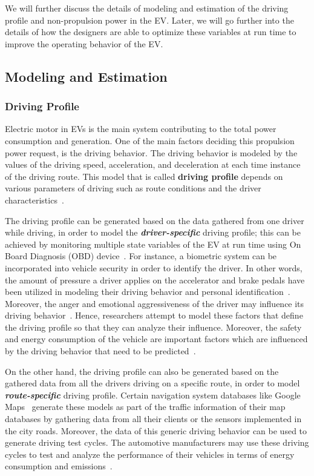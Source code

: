 We will further discuss the details of modeling and estimation of the driving profile and non-propulsion power in the EV. Later, we will go further into the details of how the designers are able to optimize these variables at run time to improve the operating behavior of the EV.

\subsection{Modeling and Estimation}

\subsubsection{Driving Profile}

Electric motor in EVs is the main system contributing to the total power consumption and generation. One of the main factors deciding this propulsion power request, is the driving behavior. The driving behavior is modeled by the values of the driving speed, acceleration, and deceleration at each time instance of the driving route. This model that is called \textbf{driving profile} depends on various parameters of driving such as route conditions and the driver characteristics~\cite{AF_1,AF_17}.

The driving profile can be generated based on the data gathered from one driver while driving, in order to model the \textit{\textbf{driver-specific}} driving profile; this can be achieved by monitoring multiple state variables of the EV at run time using On Board Diagnosis (OBD) device~\cite{AF_18}. For instance, a biometric system can be incorporated into vehicle security in order to identify the driver. In other words, the amount of pressure a driver applies on the accelerator and brake pedals have been utilized in modeling their driving behavior and personal identification~\cite{AF_19,AF_20}. Moreover, the anger and emotional aggressiveness of the driver may influence its driving behavior~\cite{AF_21,AF_22,AF_23}. Hence, researchers attempt to model these factors that define the driving profile so that they can analyze their influence. Moreover, the safety and energy consumption of the vehicle are important factors which are influenced by the driving behavior that need to be predicted~\cite{AF_23,AF_24}. 

On the other hand, the driving profile can also be generated based on the gathered data from all the drivers driving on a specific route, in order to model \textit{\textbf{route-specific}} driving profile. Certain navigation system databases like Google Maps~\cite{AF_25} generate these models as part of the traffic information of their map databases by gathering data from all their clients or the sensors implemented in the city roads. Moreover, the data of this generic driving behavior can be used to generate driving test cycles. The automotive manufacturers may use these driving cycles to test and analyze the performance of their vehicles in terms of energy consumption and emissions~\cite{AF_26,AF_27}.

